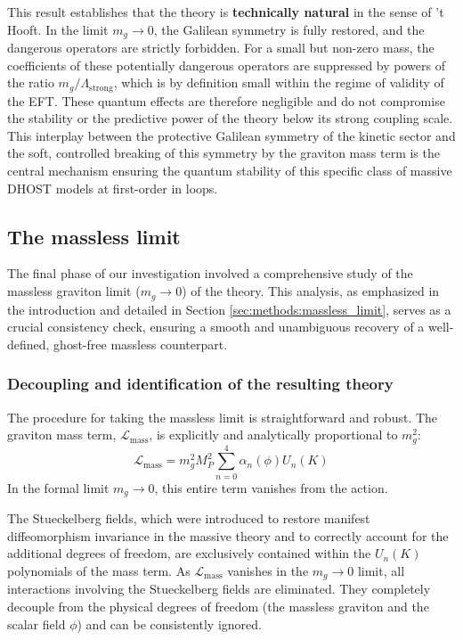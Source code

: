 \documentclass[twocolumn]{aastex631}
\begin{document}
This result establishes that the theory is \textbf{technically natural} in the sense of 't Hooft. In the limit $m_g \to 0$, the Galilean symmetry is fully restored, and the dangerous operators are strictly forbidden. For a small but non-zero mass, the coefficients of these potentially dangerous operators are suppressed by powers of the ratio $m_g / \Lambda_{\text{strong}}$, which is by definition small within the regime of validity of the EFT. These quantum effects are therefore negligible and do not compromise the stability or the predictive power of the theory below its strong coupling scale. This interplay between the protective Galilean symmetry of the kinetic sector and the soft, controlled breaking of this symmetry by the graviton mass term is the central mechanism ensuring the quantum stability of this specific class of massive DHOST models at first-order in loops.

\subsection{The massless limit}
The final phase of our investigation involved a comprehensive study of the massless graviton limit ($m_g \to 0$) of the theory. This analysis, as emphasized in the introduction and detailed in Section \ref{sec:methods:massless_limit}, serves as a crucial consistency check, ensuring a smooth and unambiguous recovery of a well-defined, ghost-free massless counterpart.

\subsubsection{Decoupling and identification of the resulting theory}
The procedure for taking the massless limit is straightforward and robust. The graviton mass term, $\mathcal{L}_{\text{mass}}$, is explicitly and analytically proportional to $m_g^2$:
\begin{equation*}
\mathcal{L}_{\text{mass}} = m_g^2 M_P^2 \sum_{n=0}^{4} \alpha_n(\phi) U_n(K)
\end{equation*}
In the formal limit $m_g \to 0$, this entire term vanishes from the action.

The Stueckelberg fields, which were introduced to restore manifest diffeomorphism invariance in the massive theory and to correctly account for the additional degrees of freedom, are exclusively contained within the $U_n(K)$ polynomials of the mass term. As $\mathcal{L}_{\text{mass}}$ vanishes in the $m_g \to 0$ limit, all interactions involving the Stueckelberg fields are eliminated. They completely decouple from the physical degrees of freedom (the massless graviton and the scalar field $\phi$) and can be consistently ignored.
\end{document}
